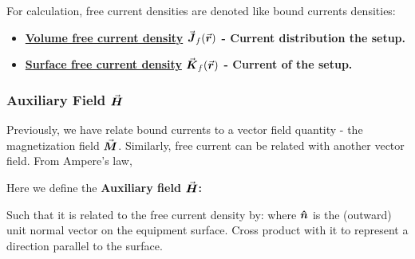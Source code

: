 \documentclass[class=article, crop=false, 12pt]{standalone}
\begin{document}
\newpage
For calculation, free current densities are denoted like bound currents densities:
\begin{itemize}
    \item \bf{\ul{Volume free current density}} $\va*{J}_f(\va*{r})$ - 
    Current distribution  the setup.

    \item \bf{\ul{Surface free current density}} $\va*{K}_f(\va*{r})$ - 
    Current  of the setup.
\end{itemize}


\subsubsection{Auxiliary Field $\va*{H}$}

Previously, we have relate bound currents to a vector field quantity - the magnetization field $\va*{M}$.
Similarly, free current can be related with another vector field.
From Ampere's law, 

Here we define the \bf{Auxiliary field} $\va*{H}$:

Such that it is related to the free current density by:
where $\vu*{n}$ is the (outward) unit normal vector on the equipment surface.
Cross product with it to represent a direction parallel to the surface.
\end{document}

